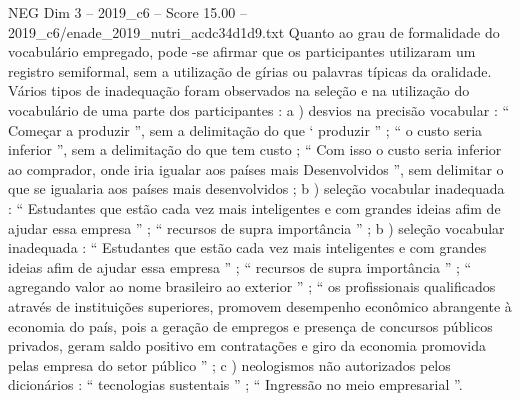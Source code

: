 \begin{textsample}{NEG Dim 3 – 2019\_c6 – Score 15.00 – 2019\_c6/enade\_2019\_nutri\_acdc34d1d9.txt}
Quanto ao grau de formalidade do vocabulário empregado, pode -se afirmar que os participantes utilizaram um registro semiformal, sem a utilização de gírias ou palavras típicas da oralidade.
Vários tipos de inadequação foram observados na seleção e na utilização do vocabulário de uma parte dos participantes : a ) desvios na precisão vocabular : “ Começar a produzir ”, sem a delimitação do que ‘ produzir ” ; “ o custo seria inferior ”, sem a delimitação do que tem custo ; “ Com isso o custo seria inferior ao comprador, onde iria igualar aos países mais Desenvolvidos ”, sem delimitar o que se igualaria aos países mais desenvolvidos ; b ) seleção vocabular inadequada : “ Estudantes que estão cada vez mais inteligentes e com grandes ideias afim de ajudar essa empresa ” ; “ recursos de supra importância ” ; b ) seleção vocabular inadequada : “ Estudantes que estão cada vez mais inteligentes e com grandes ideias afim de ajudar essa empresa ” ; “ recursos de supra importância ” ; “ agregando valor ao nome brasileiro ao exterior ” ; “ os profissionais qualificados através de instituições superiores, promovem desempenho econômico abrangente à economia do país, pois a geração de empregos e presença de concursos públicos privados, geram saldo positivo em contratações e giro da economia promovida pelas empresa do setor público ” ; c ) neologismos não autorizados pelos dicionários : “ tecnologias sustentais ” ; “ Ingressão no meio empresarial ”.

\end{textsample}
